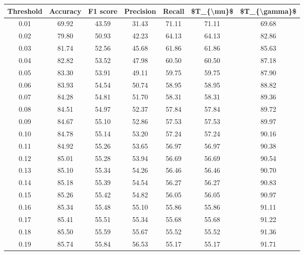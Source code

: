 \begin{tabular}{|c|c|c|c|c|c|c|}
\toprule
 Threshold &  Accuracy &  F1 score &  Precision &  Recall &  \$T\_\{\textbackslash mu\}\$ &  \$T\_\{\textbackslash gamma\}\$ \\
\hline
      0.01 &     69.92 &     43.59 &      31.43 &   71.11 &      71.11 &         69.68 \\
      0.02 &     79.80 &     50.93 &      42.23 &   64.13 &      64.13 &         82.86 \\
      0.03 &     81.74 &     52.56 &      45.68 &   61.86 &      61.86 &         85.63 \\
      0.04 &     82.82 &     53.52 &      47.98 &   60.50 &      60.50 &         87.18 \\
      0.05 &     83.30 &     53.91 &      49.11 &   59.75 &      59.75 &         87.90 \\
      0.06 &     83.93 &     54.54 &      50.74 &   58.95 &      58.95 &         88.82 \\
      0.07 &     84.28 &     54.81 &      51.70 &   58.31 &      58.31 &         89.36 \\
      0.08 &     84.51 &     54.97 &      52.37 &   57.84 &      57.84 &         89.72 \\
      0.09 &     84.67 &     55.10 &      52.86 &   57.53 &      57.53 &         89.97 \\
      0.10 &     84.78 &     55.14 &      53.20 &   57.24 &      57.24 &         90.16 \\
      0.11 &     84.92 &     55.26 &      53.65 &   56.97 &      56.97 &         90.38 \\
      0.12 &     85.01 &     55.28 &      53.94 &   56.69 &      56.69 &         90.54 \\
      0.13 &     85.10 &     55.34 &      54.26 &   56.46 &      56.46 &         90.70 \\
      0.14 &     85.18 &     55.39 &      54.54 &   56.27 &      56.27 &         90.83 \\
      0.15 &     85.26 &     55.42 &      54.82 &   56.05 &      56.05 &         90.97 \\
      0.16 &     85.34 &     55.48 &      55.10 &   55.86 &      55.86 &         91.11 \\
      0.17 &     85.41 &     55.51 &      55.34 &   55.68 &      55.68 &         91.22 \\
      0.18 &     85.50 &     55.59 &      55.67 &   55.52 &      55.52 &         91.36 \\
      0.19 &     85.74 &     55.84 &      56.53 &   55.17 &      55.17 &         91.71 \\

\end{tabular}
